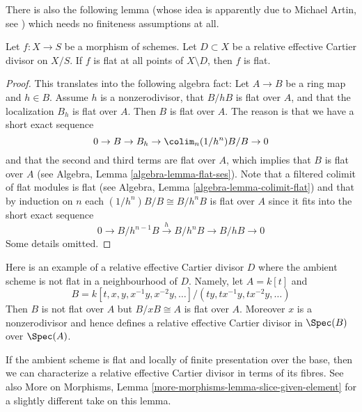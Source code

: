 \noindent
There is also the following lemma (whose idea is apparently
due to Michael Artin, see \cite{Nobile}) which needs no finiteness
assumptions at all.

\begin{lemma}
\label{lemma-michael-artin}
Let $f : X \to S$ be a morphism of schemes.
Let $D \subset X$ be a relative effective Cartier divisor on $X/S$.
If $f$ is flat at all points of $X \setminus D$, then $f$ is flat.
\end{lemma}

\begin{proof}
This translates into the following algebra fact:
Let $A \to B$ be a ring map and $h \in B$.
Assume $h$ is a nonzerodivisor, that $B/hB$ is flat over $A$, and
that the localization $B_h$ is flat over $A$. Then $B$ is flat over $A$.
The reason is that we have a short exact sequence
$$
0 \to B \to B_h \to \colim_n (1/h^n)B/B \to 0
$$
and that the second and third terms are flat over $A$, which implies
that $B$ is flat over $A$ (see
Algebra, Lemma \ref{algebra-lemma-flat-ses}). Note that a filtered
colimit of flat modules is flat (see
Algebra, Lemma \ref{algebra-lemma-colimit-flat})
and that by induction on $n$ each $(1/h^n)B/B \cong B/h^nB$ is flat over
$A$ since it fits into the short exact sequence
$$
0 \to B/h^{n - 1}B \xrightarrow{h} B/h^nB \to B/hB \to 0
$$
Some details omitted.
\end{proof}

\begin{example}
\label{example-relative-cartier-ambient-space-not-flat}
Here is an example of a relative effective Cartier divisor $D$ where the
ambient scheme is not flat in a neighbourhood of $D$. Namely, let
$A = k[t]$ and
$$
B = k[t, x, y, x^{-1}y, x^{-2}y, \ldots]/(ty, tx^{-1}y, tx^{-2}y, \ldots)
$$
Then $B$ is not flat over $A$ but $B/xB \cong A$ is flat over $A$.
Moreover $x$ is a nonzerodivisor and hence defines a relative effective
Cartier divisor in $\Spec(B)$ over $\Spec(A)$.
\end{example}

\noindent
If the ambient scheme is flat and locally of finite presentation over
the base, then we can characterize a relative effective Cartier divisor
in terms of its fibres. See also
More on Morphisms, Lemma \ref{more-morphisms-lemma-slice-given-element}
for a slightly different take on this lemma.

